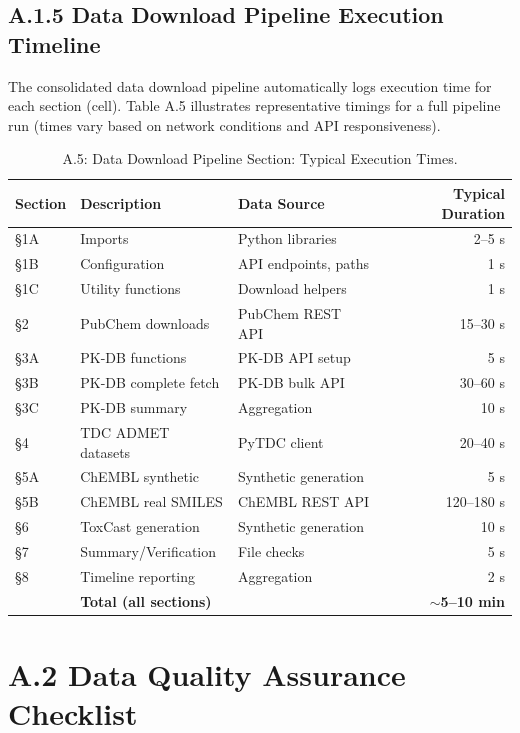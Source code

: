 \documentclass[a4paper,11pt,twoside]{report}
\begin{document}
\subsection*{A.1.5 Data Download Pipeline Execution Timeline}

The consolidated data download pipeline automatically logs execution time for each section (cell). Table A.5 illustrates representative timings for a full pipeline run (times vary based on network conditions and API responsiveness).

\begin{table}[htbp]
\centering
\footnotesize
\caption{A.5: Data Download Pipeline Section: Typical Execution Times.}
\label{tab:execution_timeline}
\begin{tabular}{l|l|l|r}
\hline
\textbf{Section} & \textbf{Description} & \textbf{Data Source} & \textbf{Typical Duration} \\
\hline
§1A & Imports & Python libraries & 2--5 s \\
§1B & Configuration & API endpoints, paths & 1 s \\
§1C & Utility functions & Download helpers & 1 s \\
§2 & PubChem downloads & PubChem REST API & 15--30 s \\
§3A & PK-DB functions & PK-DB API setup & 5 s \\
§3B & PK-DB complete fetch & PK-DB bulk API & 30--60 s \\
§3C & PK-DB summary & Aggregation & 10 s \\
§4 & TDC ADMET datasets & PyTDC client & 20--40 s \\
§5A & ChEMBL synthetic & Synthetic generation & 5 s \\
§5B & ChEMBL real SMILES & ChEMBL REST API & 120--180 s \\
§6 & ToxCast generation & Synthetic generation & 10 s \\
§7 & Summary/Verification & File checks & 5 s \\
§8 & Timeline reporting & Aggregation & 2 s \\
\hline
 & \textbf{Total (all sections)} & & \textbf{$\sim$5--10 min} \\
\hline
\end{tabular}
\end{table}

\section*{A.2 Data Quality Assurance Checklist}
\end{document}
